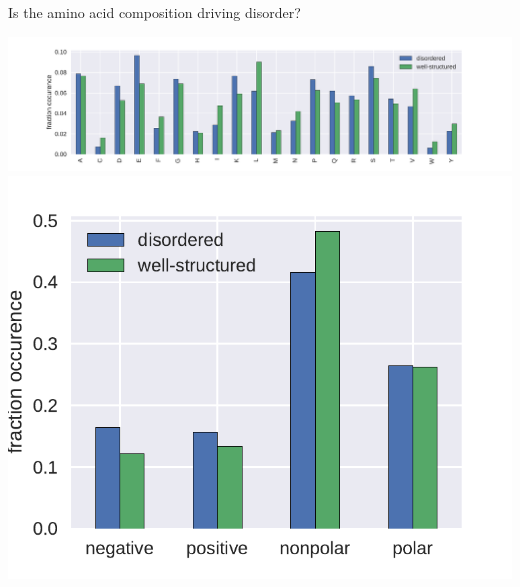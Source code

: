\documentclass{beamer}
\begin{document}
\begin{frame}{Is the amino acid composition driving disorder?}
\begin{center}
\includegraphics[width=\textwidth]{img/aacomp.pdf}\newline
\includegraphics[width=.4\textwidth]{img/aacomp_group.pdf}
\end{center}
\end{frame}



\end{document}
